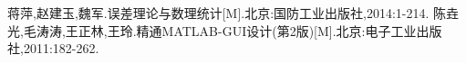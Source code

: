\begin{thebibliography}{0}
	 蒋萍,赵建玉,魏军.误差理论与数理统计[M].北京:国防工业出版社,2014:1-214.
	 陈垚光,毛涛涛,王正林,王玲.精通MATLAB-GUI设计(第2版)[M].北京:电子工业出版社,2011:182-262.
\end{thebibliography}